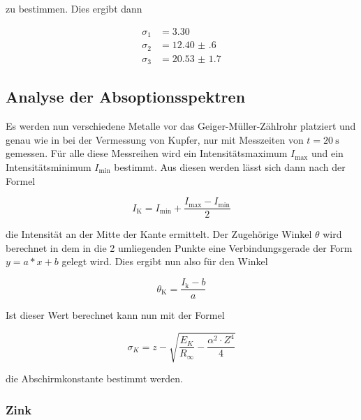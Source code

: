        \noindent zu bestimmen. Dies ergibt dann 

        \begin{align*}
            \sigma_1 &= \num{3.30}\\
            \sigma_2 &= \num{12.40(60)}\\
            \sigma_3 &= \num{20.53(170)}
          \end{align*}

    \subsection{Analyse der Absoptionsspektren}

        \noindent Es werden nun verschiedene Metalle vor das Geiger-Müller-Zählrohr platziert und genau wie in bei der Vermessung von Kupfer, 
        nur mit Messzeiten von $t = \SI{20}{\second}$ gemessen. Für alle diese Messreihen wird ein Intensitätsmaximum $I_{\text{max}}$ und ein 
        Intensitätsminimum $I_{\text{min}}$ bestimmt. Aus diesen werden lässt sich dann nach der Formel 

        \begin{equation*}
            I_{\text{K}} = I_{\text{min}} + \frac{I_{\text{max}} - I_{\text{min}}}{2}
        \end{equation*}

        \noindent die Intensität an der Mitte der Kante ermittelt. Der Zugehörige Winkel $\theta$ wird berechnet in dem in die 2 umliegenden 
        Punkte eine Verbindungsgerade der Form $y = a*x + b$ gelegt wird. Dies ergibt nun also für den Winkel 

        \begin{equation*}
            \theta_{\text{K}} = \frac{I_{\text{k}}-b}{a}
        \end{equation*}

        \noindent Ist dieser Wert berechnet kann nun mit der Formel

        \begin{equation*}
            \sigma_K = z - \sqrt{\frac{E_K}{R_{\infty}} - \frac{\alpha^2 \cdot Z^4}{4}}
        \end{equation*}

        \noindent die Abschirmkonstante bestimmt werden.

        \subsubsection{Zink}

